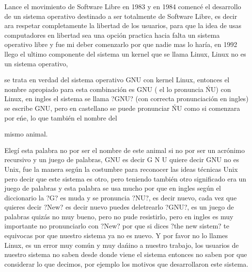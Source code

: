 \begin{multicols}{2}

Lance el movimiento de Software Libre en 1983 y en 1984 comencé el desarrollo de un sistema operativo destinado a ser totalmente de Software Libre, es decir {\em {\color{introcolor}{sin  siquiera una linea de código privativo, }}}ara respetar completamente la libertad de los usuarios, para que la idea de usas computadores en libertad sea una opción practica hacia falta un sistema operativo libre y fue mi deber comenzarlo por que nadie mas lo haría, en 1992 llego el ultimo componente del sistema un kernel que se llama Linux, Linux no es un sistema operativo,{\em {\color{introcolor}{ cuando alguien dice el sistema operativo Linux se}}}  


{\em {\color{introcolor}{ equivoca, }}} se trata en verdad del sistema operativo GNU con kernel Linux, entonces el nombre apropiado para esta combinación es GNU ( el lo pronuncia ŃU) con Linux, en ingles el sistema se llama ?GNU? (con correcta pronunciación en ingles) se escribe GNU, pero en castellano se puede pronunciar ŃU como si comenzara por eńe, lo que también el nombre del



mismo animal.


Elegí esta palabra no por ser el nombre de este animal si no por ser un acrónimo recursivo  y un juego de palabras, GNU es decir  G N U  quiere decir GNU no es Unix, fue la manera según la costumbre para reconocer las ideas técnicas Unix pero decir que este sistema es otro, pero teniendo también otro significado era un juego de palabras y esta palabra se usa mucho por que en ingles según el diccionario la ?G? es muda y se pronuncia ?NU?, es decir nuevo, cada vez que quieres decir ?New? es decir nuevo puedes deletrearlo ?GNU?, es un juego de palabras quizás no muy bueno, pero no pude resistirlo, pero en ingles  es muy importante no pronunciarlo con ?New? por que si dices ?the new sistem? te equivocas por que nuestro sistema ya no es nuevo. Y por favor no lo llames Linux, es un error muy común y muy dańino a nuestro trabajo, los usuarios de nuestro sistema no saben desde donde viene el sistema entonces no saben por que considerar lo que decimos, por ejemplo los motivos que desarrollaron este sistema. 


\end{multicols}
